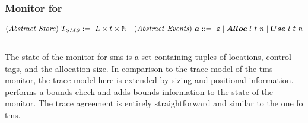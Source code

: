 \documentclass[utf8,acmsmall,review,screen,dvipsnames]{acmart}
\begin{document}
\subsubsection{Monitor for }
\begin{gather*}
  \begin{aligned}
    \mi{(Abstract\ Store)}~\smsmonitor:=\ L\times\sandboxtag\times\mb{N}\hspace{0.33cm}&
    \mi{(Abstract\ Events)}~\absevent\bnfdef\ \absev{\varepsilon} \mid \absev{Alloc\ }\loc\ \sandboxtag\ n \mid \absev{Use\ }\loc\ \sandboxtag\ n \\
  \end{aligned}
\end{gather*}
\begin{center}
  $\;$\\
\end{center}
The state of the monitor for \gls{sms} is a set containing tuples of locations, control--tags, and the allocation size.
In comparison to the trace model of the \gls{tms} monitor, the trace model here is extended by sizing and positional information.
 performs a bounds check and  adds bounds information to the state of the monitor.
The trace agreement is entirely straightforward and similar to the one fo \gls{tms}.
\end{document}
